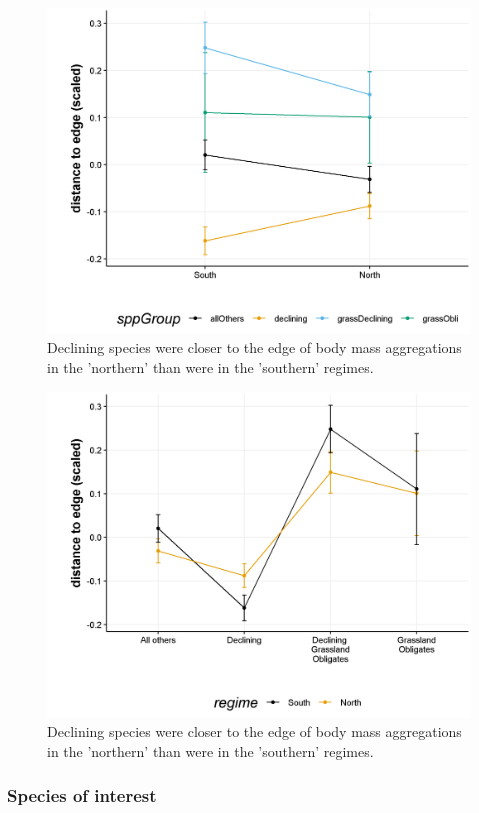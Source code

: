 \documentclass[print]{nuthesis}
\begin{document}
\begin{figure}
\includegraphics[width=0.8\linewidth]{.//chapterFiles/discontinuityAnalysis/figsCalledInDiss/intrxnPlot_regime} \caption{Declining species were closer to the edge of body mass aggregations in the 'northern' than were in the 'southern' regimes.}\label{fig:intrxnPlot-regime}
\end{figure}
\begin{figure}
\includegraphics[width=0.8\linewidth]{.//chapterFiles/discontinuityAnalysis/figsCalledInDiss/intrxnPlot_regime1} \caption{Declining species were closer to the edge of body mass aggregations in the 'northern' than were in the 'southern' regimes.}\label{fig:intrxnPlot-regime}
\end{figure}
\hypertarget{species-of-interest}{%
\subsubsection{Species of interest}\label{species-of-interest}}
\end{document}
